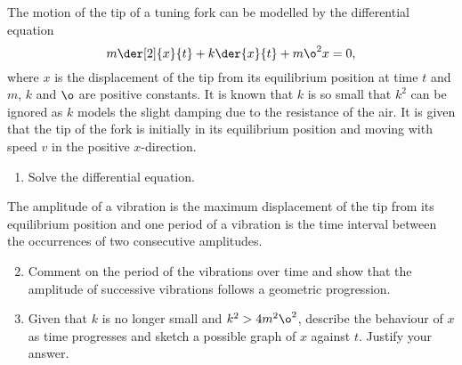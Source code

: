 \begin{problem}
    The motion of the tip of a tuning fork can be modelled by the differential equation \[m \der[2]{x}{t} + k \der{x}{t} + m \o^2 x = 0,\] where $x$ is the displacement of the tip from its equilibrium position at time $t$ and $m$, $k$ and $\o$ are positive constants. It is known that $k$ is so small that $k^2$ can be ignored as $k$ models the slight damping due to the resistance of the air. It is given that the tip of the fork is initially in its equilibrium position and moving with speed $v$ in the positive $x$-direction.

    \begin{enumerate}
        \item Solve the differential equation.
    \end{enumerate}

    The amplitude of a vibration is the maximum displacement of the tip from its equilibrium position and one period of a vibration is the time interval between the occurrences of two consecutive amplitudes.

    \begin{enumerate}
        \setcounter{enumi}{1}
        \item Comment on the period of the vibrations over time and show that the amplitude of successive vibrations follows a geometric progression.
        \item Given that $k$ is no longer small and $k^2 > 4m^2 \o^2$, describe the behaviour of $x$ as time progresses and sketch a possible graph of $x$ against $t$. Justify your answer.
    \end{enumerate}
\end{problem}
